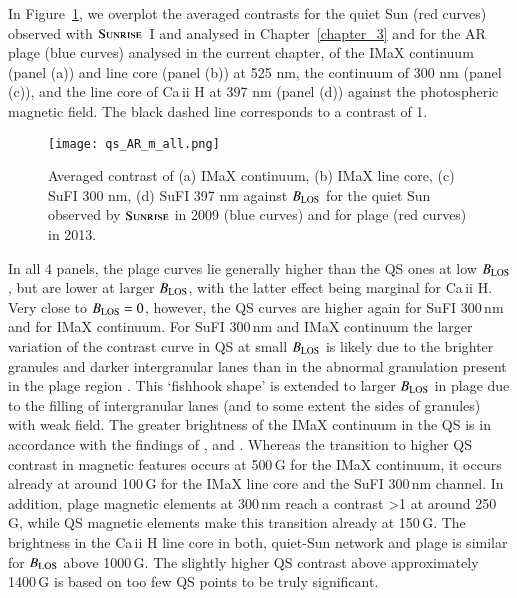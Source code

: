 \documentclass[goettingen, gauss, print]{thesis}
\begin{document}
In Figure~\ref{qs_plage}, we overplot the averaged contrasts for the quiet Sun (red curves) observed with $\textsc{Sunrise}$~I and analysed in Chapter~\ref{chapter_3} and for the AR plage (blue curves) analysed in the current chapter, of the IMaX continuum (panel (a)) and line core (panel (b)) at 525 nm, the continuum of 300 nm (panel (c)), and the line core of Ca\,{\sc ii} H at 397 nm (panel (d)) against the photospheric magnetic field. The black dashed line corresponds to a contrast of 1.

\begin{figure*}[ht!]

\centering
\hspace*{-1cm}\texttt{[image: qs\_AR\_m\_all.png]}
\caption{Averaged contrast of (a) IMaX continuum, (b) IMaX line core, (c) SuFI 300 nm, (d) SuFI 397 nm against $B_{\rm LOS}$ for the quiet Sun observed by $\textsc{Sunrise}$ in 2009 (blue curves) and for plage (red curves) in 2013.}
\label{qs_plage}
\end{figure*}

In all 4 panels, the plage curves lie generally higher than the QS ones at low $B_{\rm LOS}$, but are lower at larger $B_{\rm LOS}$, with the latter effect being marginal for Ca\,{\sc ii} H. Very close to $B_{\rm LOS}=0$, however, the QS curves are higher again for SuFI 300\,nm and for IMaX continuum.
For SuFI 300\,nm and IMaX continuum the larger variation of the contrast curve in QS at small $B_{\rm LOS}$ is likely due to the brighter granules and darker intergranular lanes than in the abnormal granulation present in the plage region \citep{narayan_small-scale_2010}. This `fishhook shape' \citep{schnerr_brightness_2011} is extended to larger $B_{\rm LOS}$ in plage due to the filling of intergranular lanes (and to some extent the sides of granules) with weak field. The greater brightness of the IMaX continuum in the QS is in accordance with the findings of \cite{title_differences_1992}, \cite{lawrence_contrast_1993} and \cite{kobel_continuum_2011}. Whereas the transition to higher QS contrast in magnetic features occurs at 500\,G for the IMaX continuum, it occurs already at around 100\,G for the IMaX line core and the SuFI 300\,nm channel. In addition, plage magnetic elements at 300\,nm reach a contrast >1 at around 250\,G, while QS magnetic elements make this transition already at 150\,G. The brightness in the Ca\,{\sc ii} H line core in both, quiet-Sun network and plage is similar for $B_{\rm LOS}$ above 1000\,G. The slightly higher QS contrast above approximately 1400\,G is based on too few QS points to be truly significant.
 
\end{document}
